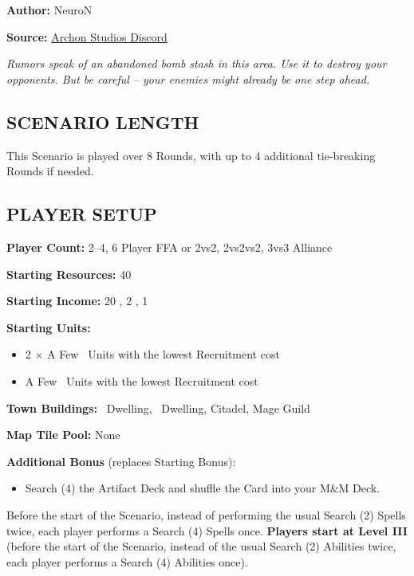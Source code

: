 
\begin{multicols}{2}

\textbf{Author:} NeuroN

\textbf{Source:} \href{https://discord.com/channels/740870068178649108/1278750250722525203/1278750250722525203}{Archon Studios Discord}

\textit{Rumors speak of an abandoned bomb stash in this area.
Use it to destroy your opponents.
But be careful -- your enemies might already be one step ahead.}

\subsection*{\MakeUppercase{Scenario Length}}
This Scenario is played over 8 Rounds, with up to 4 additional tie-breaking Rounds if needed.

\subsection*{\MakeUppercase{Player Setup}}
\textbf{Player Count:} 2--4, 6 Player FFA or 2vs2, 2vs2vs2, 3vs3 Alliance

\textbf{Starting Resources:} 40 

\textbf{Starting Income:} 20 , 2 , 1 

\textbf{Starting Units:}
\begin{itemize}
  \item 2 × A Few \bronze\ Units with the lowest Recruitment cost
  \item A Few \silver\ Units with the lowest Recruitment cost
\end{itemize}

\textbf{Town Buildings:} \bronze\ Dwelling, \silver\ Dwelling, Citadel, Mage Guild

\textbf{Map Tile Pool:} None

\textbf{Additional Bonus} (replaces Starting Bonus):

\begin{itemize}
  \item Search (4) the Artifact Deck and shuffle the Card into your M\&M Deck.
\end{itemize}
Before the start of the Scenario, instead of performing the usual Search (2) Spells twice, each player performs a Search (4) Spells once.
\textbf{Players start at Level III} (before the start of the Scenario, instead of the usual Search (2) Abilities twice, each player performs a Search (4) Abilities once).


\end{multicols}
